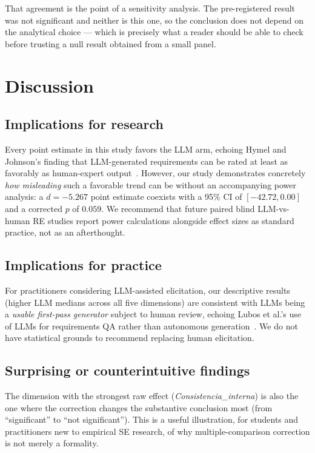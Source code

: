 \documentclass{llncs}
\begin{document}
That agreement is the point of a sensitivity analysis. The pre-registered result was not
significant and neither is this one, so the conclusion does not depend on the analytical choice
--- which is precisely what a reader should be able to check before trusting a null result
obtained from a small panel.

\section{Discussion}

\subsection{Implications for research}
Every point estimate in this study favors the LLM arm, echoing Hymel and Johnson's
finding that LLM-generated requirements can be rated at least as favorably as
human-expert output~\cite{hymel2025analysis}. However, our study demonstrates
concretely \emph{how misleading} such a favorable trend can be without an accompanying
power analysis: a $d=-5.267$ point estimate coexists with a 95\% CI of
$[-42.72, 0.00]$ and a corrected $p$ of $0.059$. We recommend that future paired blind
LLM-vs-human RE studies report power calculations alongside effect sizes as standard
practice, not as an afterthought.

\subsection{Implications for practice}
For practitioners considering LLM-assisted elicitation, our descriptive results (higher
LLM medians across all five dimensions) are consistent with LLMs being a
\emph{usable first-pass generator} subject to human review, echoing Lubos et al.'s use
of LLMs for requirements QA rather than autonomous generation~\cite{lubos2024leveraging}.
We do not have statistical grounds to recommend replacing human elicitation.

\subsection{Surprising or counterintuitive findings}
The dimension with the strongest raw effect (\emph{Consistencia\_interna}) is also the
one where the correction changes the substantive conclusion most (from ``significant''
to ``not significant''). This is a useful illustration, for students and practitioners
new to empirical SE research, of why multiple-comparison correction is not merely a
formality.
\end{document}
